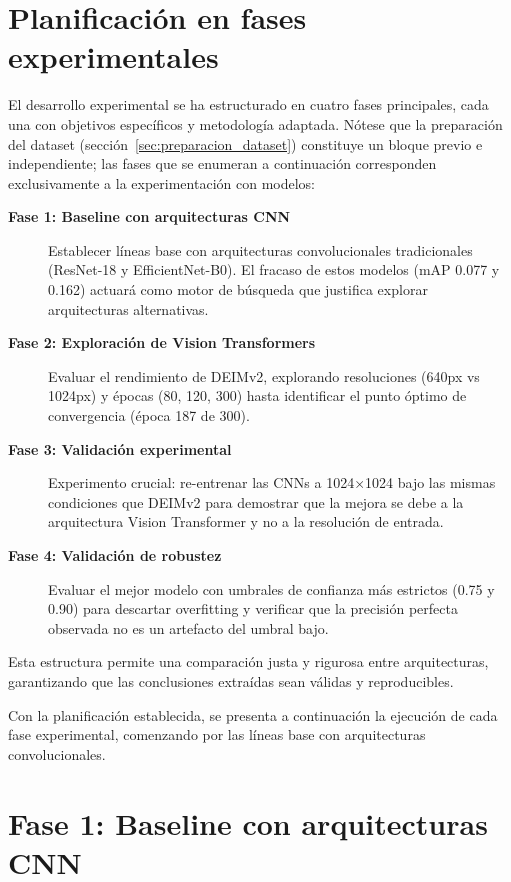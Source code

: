 \section{Planificación en fases experimentales}
\label{sec:planificacion}

El desarrollo experimental se ha estructurado en cuatro fases principales, cada una con objetivos específicos y metodología adaptada. Nótese que la preparación del dataset (sección~\ref{sec:preparacion_dataset}) constituye un bloque previo e independiente; las fases que se enumeran a continuación corresponden exclusivamente a la experimentación con modelos:

\begin{description}
    \item[\textbf{Fase 1: Baseline con arquitecturas CNN}] Establecer líneas base con arquitecturas convolucionales tradicionales (ResNet-18 y EfficientNet-B0). El fracaso de estos modelos (mAP 0.077 y 0.162) actuará como motor de búsqueda que justifica explorar arquitecturas alternativas.
    
    \item[\textbf{Fase 2: Exploración de Vision Transformers}] Evaluar el rendimiento de DEIMv2, explorando resoluciones (640px vs 1024px) y épocas (80, 120, 300) hasta identificar el punto óptimo de convergencia (época 187 de 300).
    
    \item[\textbf{Fase 3: Validación experimental}] Experimento crucial: re-entrenar las CNNs a 1024×1024 bajo las mismas condiciones que DEIMv2 para demostrar que la mejora se debe a la arquitectura Vision Transformer y no a la resolución de entrada.
    
    \item[\textbf{Fase 4: Validación de robustez}] Evaluar el mejor modelo con umbrales de confianza más estrictos (0.75 y 0.90) para descartar overfitting y verificar que la precisión perfecta observada no es un artefacto del umbral bajo.
\end{description}

Esta estructura permite una comparación justa y rigurosa entre arquitecturas, garantizando que las conclusiones extraídas sean válidas y reproducibles.

Con la planificación establecida, se presenta a continuación la ejecución de cada fase experimental, comenzando por las líneas base con arquitecturas convolucionales.

\section{Fase 1: Baseline con arquitecturas CNN}
\label{sec:fase1}

